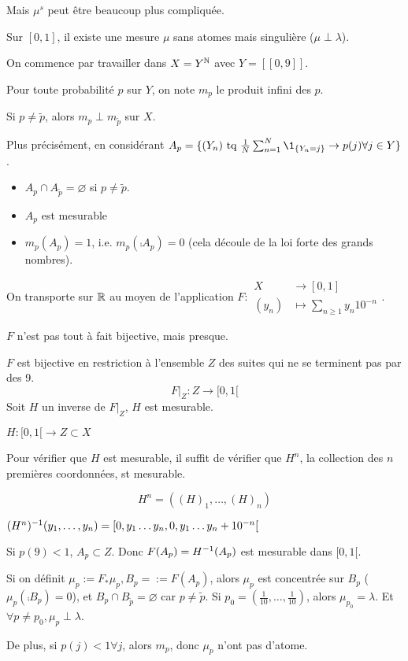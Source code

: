 \documentclass[10pt,a4paper,notitlepage ]{report}
\begin{document}
Mais $\mu^s$ peut être beaucoup plus compliquée.

\begin{theorem}
	Sur $[0,1]$, il existe une mesure $\mu$ sans atomes mais singulière ($\mu\perp\lambda$).
\end{theorem}

\begin{demo}
	On commence par travailler dans $X=Y^\mathbb N$ avec $Y=[\![0,9]\!]$.
	
	Pour toute probabilité $p$ sur $Y$, on note $m_p$ le produit infini des $p$.
	
	\begin{lemme}
		Si $p\neq \tilde p$, alors $m_p \perp m_{\tilde p}$ sur $X$.
	\end{lemme}	
	\begin{demo}
		Plus précisément, en considérant $A_p=\{(Y_n) \text{ tq } \frac 1 N\sum_{n=1}^N \1_{\{Y_n=j\}} \rightarrow p(j) \forall j\in Y\}$.
		\begin{itemize}
			\item $A_p\cap A_{\tilde p} = \varnothing$ si $p\neq\tilde p$.
			\item $A_p$ est mesurable
			\item $m_p(A_p)=1$, i.e. $m_p(\comp{A_p}) = 0$ (cela découle de la loi forte des grands nombres).
		\end{itemize}
	\end{demo}
	On transporte sur $\mathbb R$ au moyen de l'application $F: \begin{aligned} X&\rightarrow [0,1] \\ (y_n) &\mapsto \sum_{n\ge 1} y_n 10^{-n}\end{aligned}$.
	
	$F$ n'est pas tout à fait bijective, mais presque.
	
	$F$ est bijective en restriction à l'ensemble $Z$ des suites qui ne se terminent pas par des 9.
	\[
	F|_Z : Z \rightarrow [0,1[
	\]
	Soit $H$ un inverse de $F|_Z$, $H$ est mesurable.
	
	$H : [0,1[ \rightarrow Z\subset X$
	
	Pour vérifier que $H$ est mesurable, il suffit de vérifier que $H^n$, la collection des $n$ premières coordonnées, st mesurable.
	
	\[H^n =((H)_1, \dots, (H)_n)\]
	
	$(H^n)^{-1}(y_1,\dots,y_n) = [0,y_1\dots y_n, 0,y_1\dots y_n+10^{-n}[$
	
	Si $p(9)<1$, $A_p\subset Z$. Donc $F(A_p) = H^{-1}(A_p)$ est mesurable dans $[0,1[$.
	
	Si on définit $\mu_p := F_*\mu_p, B_p=:=F(A_p)$, alors $\mu_p$ est concentrée sur $B_p$ ($\mu_p(\comp{B_p}) = 0$), et $B_p\cap B_{\tilde p} = \varnothing$ car $p\neq \tilde p$.
	Si $p_0 = (\frac 1 {10}, \dots, \frac 1 {10})$, alors $\mu_{p_0} = \lambda$. Et $\forall p\neq p_0, \mu_p \perp \lambda$.
	
	De plus, si $p(j) < 1 \forall j$, alors $m_p$, donc $\mu_p$ n'ont pas d'atome.
\end{demo}
\end{document}
